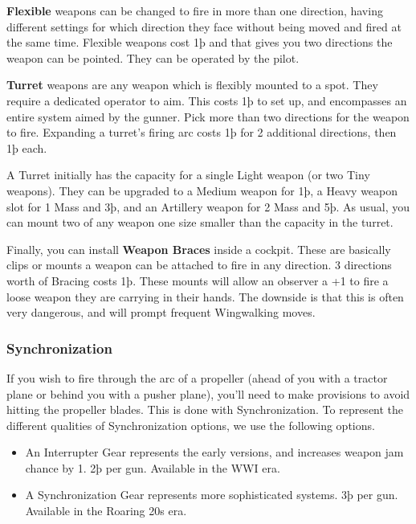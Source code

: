 \documentclass{article}
\begin{document}
\textbf{Flexible }{weapons can be changed to fire in more
    than one direction, having different settings for which direction they
    face without being moved and fired at the same time. Flexible weapons
    cost 1þ and that gives you two directions the weapon can be pointed.
    They can be operated by the pilot.}

\textbf{Turret}{ weapons are any weapon which is flexibly
    mounted to a spot. They require a dedicated operator to aim. This costs
    1þ to set up, and encompasses an entire system aimed by the gunner. Pick
    more than two directions for the weapon to fire. Expanding a turret's
    firing arc costs 1þ for 2 additional directions, then 1þ each.}

A Turret initially has the capacity for a single Light weapon (or
two Tiny weapons). They can be upgraded to a Medium weapon for 1þ, a
Heavy weapon slot for 1 Mass and 3þ, and an Artillery weapon for 2 Mass
and 5þ. As usual, you can mount two of any weapon one size smaller than
the capacity in the turret.

Finally, you can install \textbf{Weapon Braces}
inside a cockpit. These are basically clips or mounts a weapon can be
attached to fire in any direction. 3 directions worth of Bracing costs
1þ. These mounts will allow an observer a +1 to fire a loose weapon they
are carrying in their hands. The downside is that this is often very
dangerous, and will prompt frequent Wingwalking moves.

\subsubsection{Synchronization}
\label{_Synchronization}

If you wish to fire through the arc of a propeller (ahead of you with a
tractor plane or behind you with a pusher plane), you'll need to make
provisions to avoid hitting the propeller blades. This is done with
Synchronization. To represent the different qualities of Synchronization
options, we use the following options.

\begin{itemize}
    \item          An Interrupter Gear represents the early versions, and
          increases weapon jam chance by 1. 2þ per gun. Available in the WWI
          era.
    \item          A Synchronization Gear represents more sophisticated systems.
          3þ per gun. Available in the Roaring 20s era.
\end{itemize}
\end{document}

